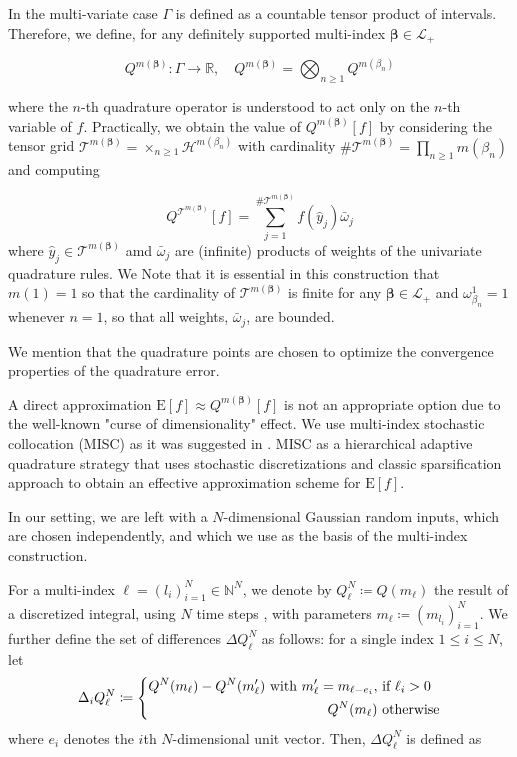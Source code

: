 \documentclass[11pt]{article}
\newcommand{\expt}[1]{\mathrm{E}\left[#1\right]}
\newcommand{\rset}{\mathbb{R}}
\begin{document}
In the multi-variate case $\Gamma$ is defined as a countable tensor
product of intervals. Therefore,  we define, for any definitely supported multi-index $\boldsymbol{\beta} \in \mathcal{L}_+$

$$Q^{m(\boldsymbol{\beta})}: \Gamma \rightarrow \rset,\quad  Q^{m(\boldsymbol{\beta})}= \bigotimes_{n \ge 1} Q^{m(\beta_n)} $$

where the $n$-th quadrature operator is understood to act only on the $n$-th variable of $f$. Practically, we obtain the value of $Q^{m(\boldsymbol{\beta})}[f]$  by considering the tensor grid $\mathcal{T}^{m(\boldsymbol{\beta})}= \times_{n \ge 1} \mathcal{H}^{m(\beta_n)}$ with cardinality $\#\mathcal{T}^{m(\boldsymbol{\beta})}=\prod_{n \ge 1} m (\beta_n)$ and computing

$$ Q^{\mathcal{T}^{m(\boldsymbol{\beta})}}[f]= \sum_{j=1}^{\#\mathcal{T}^{m(\boldsymbol{\beta})}} f(\hat{y}_j) \bar{\omega}_j$$
where $\hat{y}_j \in \mathcal{T}^{m(\boldsymbol{\beta})}$ amd $\bar{\omega}_j$ are (infinite) products of weights of the univariate quadrature rules. We Note that it is essential in this construction that $m(1)=1$ so that the cardinality of $\mathcal{T}^{m(\boldsymbol{\beta})}$ is finite for any $\boldsymbol{\beta} \in \mathcal{L}_+$ and $ \omega_{\beta_n}^1=1$ whenever $n = 1$, so that all weights, $\bar{\omega}_j$, are bounded.

We mention that the quadrature points are chosen to optimize the convergence properties of the quadrature error.  

A direct approximation $\expt{f} \approx Q^{m(\boldsymbol{\beta})}[f]$ is not an appropriate option  due to the well-known "curse of dimensionality" effect. We use multi-index stochastic collocation (MISC) as it was suggested  in \cite{haji2016multi}. MISC as a hierarchical adaptive quadrature strategy that uses  stochastic discretizations  and classic sparsification approach to obtain an effective approximation scheme for $\expt{f}$. 


In our setting, we are left with a $N$-dimensional Gaussian random inputs, which are chosen independently, and which we use as the basis of the multi-index construction. 

For a multi-index $\ell = (l_i)_{i=1}^{N} \in \mathbb{N}^{N}$, we denote by
$Q^N_\ell \coloneqq Q(m_{\ell})$ the result of a discretized
integral, using $N$ time steps , with parameters $m_\ell \coloneqq (m_{l_i})_{i=1}^{N}$. We further define the set of
differences $\Delta Q^N_\ell$ as follows: for a single index $1 \le i \le N$,
let
\begin{equation}
\Delta_i Q^N_\ell \coloneqq \left\{ 
\aligned 
Q^N(m_\ell) - Q^N(m_\ell') \text{ with } m_\ell' =
m_{\ell - e_i}, & \text{ if } \ell_i>0 \\
Q^N(m_\ell) & \text{ otherwise}
\endaligned
\right.
\end{equation}
where $e_i$ denotes the $i$th $N$-dimensional unit vector.  Then, $\Delta
Q^N_\ell$ is defined as
\end{document}
